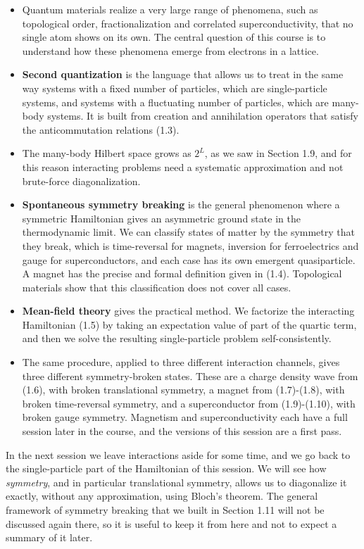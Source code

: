 \begin{itemize}
\item Quantum materials realize a very large range of phenomena, such as topological order,
  fractionalization and correlated superconductivity, that no single atom shows on its own. The
  central question of this course is to understand how these phenomena emerge from electrons in a
  lattice.
\item \textbf{Second quantization} is the language that allows us to treat in the same way systems
  with a fixed number of particles, which are single-particle systems, and systems with a
  fluctuating number of particles, which are many-body systems. It is built from creation and
  annihilation operators that satisfy the anticommutation relations (1.3).
\item The many-body Hilbert space grows as $2^L$, as we saw in Section 1.9, and for this reason
  interacting problems need a systematic approximation and not brute-force diagonalization.
\item \textbf{Spontaneous symmetry breaking} is the general phenomenon where a symmetric Hamiltonian
  gives an asymmetric ground state in the thermodynamic limit. We can classify states of matter by
  the symmetry that they break, which is time-reversal for magnets, inversion for ferroelectrics
  and gauge for superconductors, and each case has its own emergent quasiparticle. A magnet has the
  precise and formal definition given in (1.4). Topological materials show that this
  classification does not cover all cases.
\item \textbf{Mean-field theory} gives the practical method. We factorize the interacting
  Hamiltonian (1.5) by taking an expectation value of part of the quartic term, and then we solve
  the resulting single-particle problem self-consistently.
\item The same procedure, applied to three different interaction channels, gives three different
  symmetry-broken states. These are a charge density wave from (1.6), with broken translational
  symmetry, a magnet from (1.7)-(1.8), with broken time-reversal symmetry, and a superconductor from
  (1.9)-(1.10), with broken gauge symmetry. Magnetism and superconductivity each have a full session
  later in the course, and the versions of this session are a first pass.
\end{itemize}

In the next session we leave interactions aside for some time, and we go back to the
single-particle part of the Hamiltonian of this session. We will see how \emph{symmetry}, and in
particular translational symmetry, allows us to diagonalize it exactly, without any approximation,
using Bloch's theorem. The general framework of symmetry breaking that we built in Section 1.11 will
not be discussed again there, so it is useful to keep it from here and not to expect a summary of
it later.
